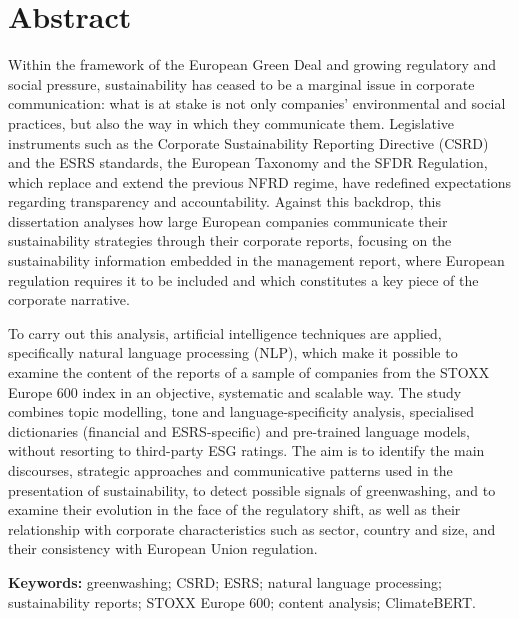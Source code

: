 \section*{Abstract}

Within the framework of the European Green Deal and growing regulatory and social pressure,
sustainability has ceased to be a marginal issue in corporate communication: what is at stake is
not only companies' environmental and social practices, but also the way in which they
communicate them. Legislative instruments such as the Corporate Sustainability Reporting
Directive (CSRD) and the ESRS standards, the European Taxonomy and the SFDR Regulation, which
replace and extend the previous NFRD regime, have redefined expectations regarding transparency
and accountability. Against this backdrop, this dissertation analyses how large European
companies communicate their sustainability strategies through their corporate reports, focusing
on the sustainability information embedded in the management report, where European regulation
requires it to be included and which constitutes a key piece of the corporate narrative.

To carry out this analysis, artificial intelligence techniques are applied, specifically natural
language processing (NLP), which make it possible to examine the content of the reports of a
sample of companies from the STOXX Europe 600 index in an objective, systematic and scalable
way. The study combines topic modelling, tone and language-specificity analysis, specialised
dictionaries (financial and ESRS-specific) and pre-trained language models, without resorting to
third-party ESG ratings. The aim is to identify the main discourses, strategic approaches and
communicative patterns used in the presentation of sustainability, to detect possible signals of
greenwashing, and to examine their evolution in the face of the regulatory shift, as well as
their relationship with corporate characteristics such as sector, country and size, and their
consistency with European Union regulation.

\medskip
\noindent\textbf{Keywords:} greenwashing; CSRD; ESRS; natural language processing; sustainability
reports; STOXX Europe 600; content analysis; ClimateBERT.

\clearpage
